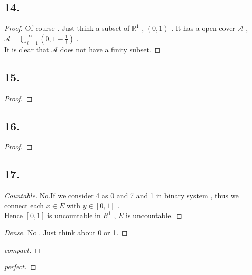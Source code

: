 \documentclass{report}
\begin{document}
            \subsection*{14.}
                \begin{proof}
                    Of course . Just think a subset of $\mathbb{R}^1$ , $(0,1)$ .
                    It has a open cover $\mathcal{A} $ , $\mathcal{A}=\bigcup_{i=1}^\infty (0,1-\frac{1}{i})$ .\\
                    It is clear that $\mathcal{A}$ does not have a finity subset.
                \end{proof}
            \subsection*{15.}
                \begin{proof}

                \end{proof}
            \subsection*{16.}
                \begin{proof}
                    
                \end{proof}
            \subsection*{17.}
                \begin{proof}[Countable]
                    No.If we consider 4 as 0 and 7 and 1 in binary system , thus we connect each $x \in E$ with $y \in [0,1]$ .\\
                    Hence $[0,1]$ is uncountable in $R^1$ , $E$ is uncountable.
                \end{proof}
                \begin{proof}[Dense]
                    No . Just think about 0 or 1.
                \end{proof}
                \begin{proof}[compact]
                    
                \end{proof}
                \begin{proof}[perfect]
                    
                \end{proof}
\end{document}
